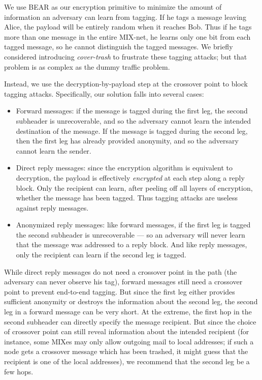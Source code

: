 \documentclass{llncs}
\begin{document}
We use BEAR as our encryption primitive to minimize the amount of
information an adversary can learn from tagging. If he tags a message
leaving Alice, the payload will be entirely random when it reaches
Bob. Thus if he tags more than one message in the entire MIX-net, he
learns only one bit from each tagged message, so he cannot distinguish
the tagged messages. We briefly considered introducing \emph{cover-trash}
to frustrate these tagging attacks; but that problem is as complex as
the dummy traffic problem.

Instead, we use the decryption-by-payload step at the crossover point to
block tagging attacks. Specifically, our solution falls into several cases:

\begin{itemize}
\item Forward messages: if the message is tagged during the first leg,
the second subheader is unrecoverable, and so the adversary cannot
learn the intended destination of the message. If the message is tagged
during the second leg, then the first leg has already provided anonymity,
and so the adversary cannot learn the sender.
\item Direct reply messages: since the encryption algorithm is equivalent to
decryption, the payload is effectively \emph{encrypted} at each step
along a reply block. Only the recipient can learn, after peeling off
all layers of encryption, whether the message has been tagged. Thus
tagging attacks are useless against reply messages.
\item Anonymized reply messages: like forward messages, if the first leg
is tagged the second subheader is unrecoverable --- so an adversary will
never learn that the message was addressed to a reply block. And like
reply messages, only the recipient can learn if the second leg is tagged.
\end{itemize}

While direct reply messages do not need a crossover point in the path
(the adversary can never observe his tag), forward messages still need a
crossover point to prevent end-to-end tagging. But since the first leg
either provides sufficient anonymity or destroys the information about
the second leg, the second leg in a forward message can be very short.
At the extreme, the first hop in the second subheader can directly
specify the message recipient. But since the choice of crossover point
can still reveal information about the intended recipient (for instance,
some MIXes may only allow outgoing mail to local addresses; if such a
node gets a crossover message which has been trashed, it might guess
that the recipient is one of the local addresses), we recommend that
the second leg be a few hops.
\end{document}
